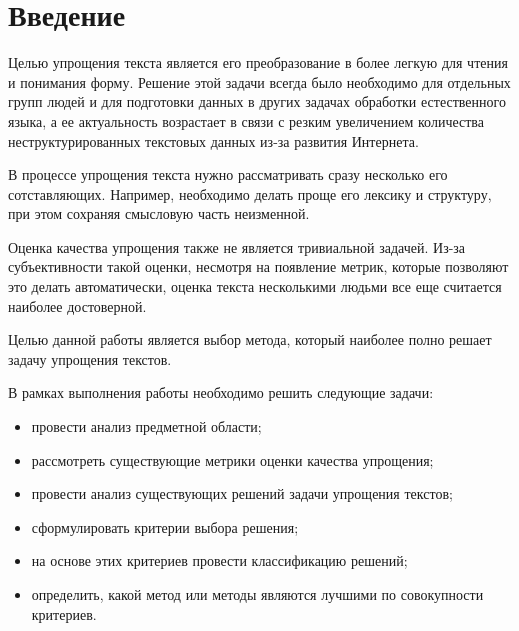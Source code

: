 \chapter*{Введение}

Целью упрощения текста является его преобразование в более легкую для чтения и понимания форму. Решение этой задачи всегда было необходимо для отдельных групп людей\cite{liu_simplification_2016}\cite{evans_evaluation_2014} и для подготовки данных в других задачах обработки естественного языка\cite{finegan_dollak_sentence_2016}, а ее актуальность возрастает в связи с резким увеличением количества неструктурированных текстовых данных из-за развития Интернета.

В процессе упрощения текста нужно рассматривать сразу несколько его сотставляющих. Например, необходимо делать проще его лексику и структуру, при этом сохраняя смысловую часть неизменной.

Оценка качества упрощения также не является тривиальной задачей. Из-за субъективности такой оценки, несмотря на появление метрик, которые позволяют это делать автоматически, оценка текста несколькими людьми все еще считается наиболее достоверной\cite{shardlow_survey_2014}.

Целью данной работы является выбор метода, который наиболее полно решает задачу упрощения текстов.

В рамках выполнения работы необходимо решить следующие задачи: 
\begin{itemize}
	\item провести анализ предметной области;
	\item рассмотреть существующие метрики оценки качества упрощения;
	\item провести анализ существующих решений задачи упрощения текстов;
	\item сформулировать критерии выбора решения;
	\item на основе этих критериев провести классификацию решений;
	\item определить, какой метод или методы являются лучшими по совокупности критериев.
\end{itemize}
